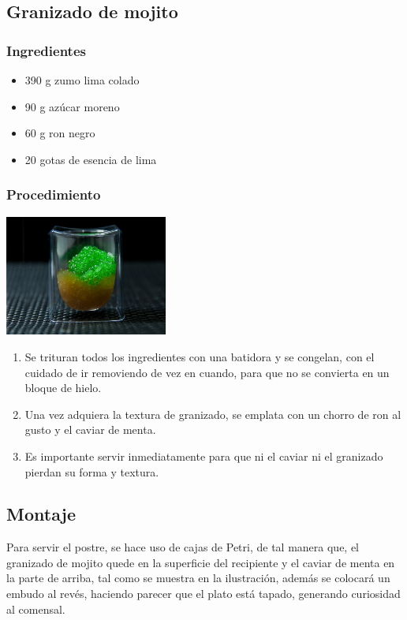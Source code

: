\documentclass{scrartcl}
\begin{document}
		\subsection{Granizado de mojito}
			\subsubsection{Ingredientes}
				\begin{multicols}{2}
					\begin{itemize}
						\item 390 g zumo lima colado 
						\item 90 g azúcar moreno 
						\item 60 g ron negro 
						\item 20 gotas de esencia de lima
					\end{itemize}
				\end{multicols}
			     
			\subsubsection{Procedimiento \cite{maite}}
			\begin{multicols}{2}
				\begin{center}
					\includegraphics[width = 0.4\textwidth]{images/caviar4}
				\end{center}
				\begin{enumerate}
					\item Se trituran todos los ingredientes con una batidora y se congelan, con el cuidado de ir removiendo de vez en cuando, para que no se convierta en un bloque de hielo. 
					\item Una vez adquiera la textura de granizado, se emplata con un chorro de ron al gusto y el caviar de menta.   
					\item Es importante servir inmediatamente para que ni el caviar ni el granizado pierdan su forma y textura. 
				\end{enumerate}
			\end{multicols}
		
		\subsection{Montaje}
			Para servir el postre, se hace uso de cajas de Petri, de tal manera que, el granizado de mojito quede en la superficie del recipiente y el caviar de menta en la parte de arriba, tal como se muestra en la ilustración, además se colocará un embudo al revés, haciendo parecer que el plato está tapado, generando curiosidad al comensal. 
	
	\newpage
	
	
\end{document}

